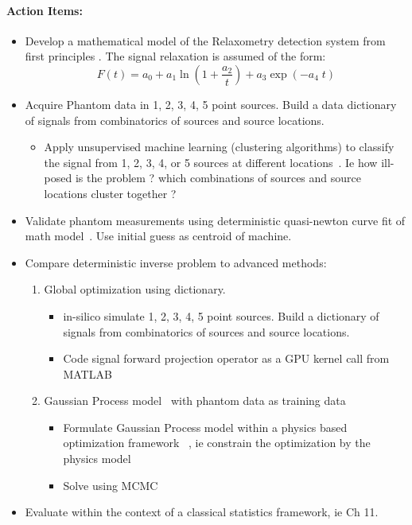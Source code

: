 \documentclass{article}         %
\theoremstyle{definition}
\theoremstyle{remark}
\begin{document}
\paragraph{Action Items:}  
\begin{itemize}
\item Develop a mathematical model of the Relaxometry detection system from 
first principles \cite{Flynn2005}. The signal relaxation is assumed of the form:
\[
  F(t) = a_0 + a_1 \ln\left(1 + \frac{a_2}{t}\right) +a_3 \exp\left(-a_4 \; t\right)
\]
\item Acquire Phantom data in 1, 2, 3, 4, 5 point sources.  Build a data
dictionary of signals from combinatorics of sources and source locations. 
   \begin{itemize}
   \item Apply unsupervised machine learning (clustering algorithms) 
         to classify the signal from 1, 2, 3, 4, or 5 
         sources at different locations~\cite{Fraley2002,Sebastiani2003,Kapp2007,
         Shi2014,Criminisi2013,Murphy2012a,Bishop2006,Gelman2007}. 
         Ie how ill-posed is the problem ? which
         combinations of sources and source locations cluster together ? 
   \end{itemize}
\item Validate phantom measurements using deterministic quasi-newton curve fit of math 
      model~\cite{Fegan2010,Adolphi2010,Hathaway2011,Tessier2012,Adolphi2014,Schwindt2013,Shen2012,Hajdu2013,Paik2013,Amiri2011}. 
      Use initial guess as centroid of machine.
\item Compare deterministic inverse problem to advanced methods:
\begin{enumerate}
\item Global optimization using dictionary. 
   \begin{itemize}
   \item in-silico simulate 1, 2, 3, 4, 5 point sources. Build a dictionary of 
      signals from combinatorics of sources and source locations. 
   \item Code signal forward projection operator as a GPU kernel call from MATLAB
   \end{itemize}
\item Gaussian Process model~\cite{Rasmussen2006} with phantom data as training data
   \begin{itemize}
   \item Formulate Gaussian Process model within a physics based
         optimization framework~\cite{Constantinescu2013} , ie
         constrain the optimization by the physics model
   \item Solve using MCMC~\cite{Liu2002,Martin2012,kaipio2005statistical,Tan2012}
   \end{itemize}
\end{enumerate}
\item Evaluate within the context of a classical statistics framework, ie \cite{Rosner2010} Ch 11.
\end{itemize}
\end{document}
